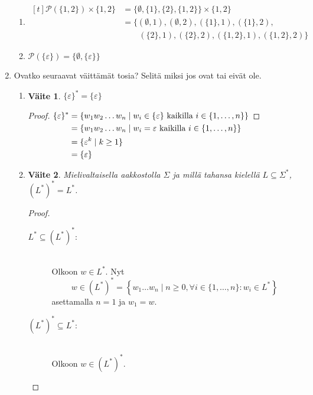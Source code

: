 \documentclass[a4paper,11pt,draft]{article}
\newtheorem*{claim}{Väite}
\begin{document}
\begin{enumerate}
\begin{enumerate}
  \item
    \begin{math}
      \begin{aligned}[t]
        \mathcal{P}(\{1,2\}) \times \{1,2\}
        &= \{\emptyset, \{1\}, \{2\}, \{1,2\}\} \times \{1,2\} \\
        &= \{(\emptyset, 1), (\emptyset, 2), (\{1\}, 1), (\{1\}, 2),\\
        &\qquad(\{2\}, 1), (\{2\}, 2), (\{1,2\}, 1), (\{1,2\}, 2)\}
      \end{aligned}
    \end{math}

  \item
    $\mathcal{P}(\{\varepsilon\}) = \{\emptyset, \{\varepsilon\}\}$
  \end{enumerate}

\item Ovatko seuraavat väittämät tosia? Selitä miksi jos ovat tai
  eivät ole.
  \begin{enumerate}
  \item
    \begin{claim}
      $\{\varepsilon\}^{*} = \{\varepsilon\}$
    \end{claim}
    \begin{proof}
    \begin{math}
      \begin{aligned}[t]
        \{\varepsilon\}^*
        &= \{w_1w_2 \ldots w_n \mid w_i \in \{\varepsilon\} \text{
          kaikilla } i \in \{1, \ldots, n\}\}\\
        &= \{w_1w_2 \ldots w_n \mid w_i = \varepsilon \text{ kaikilla
        } i \in \{1, \ldots, n\}\}\\
        &= \{\varepsilon^k \mid k \ge 1\}\\
        &= \{\varepsilon\} \qedhere
      \end{aligned}
    \end{math}
    \end{proof}

\newpage
  \item
    \begin{claim}
      Mielivaltaisella aakkostolla $\Sigma$ ja millä tahansa kielellä
      $L \subseteq \Sigma^*$, $(L^*)^* = L^*$.
    \end{claim}
    \begin{proof}
      \hfill
      \begin{description}
      \item[$L^* \subseteq (L^*)^*$:] \hfill \\
        Olkoon $w \in L^*$. Nyt
        \begin{equation*}
        w \in (L^*)^* = \left\{w_1 \ldots w_n \mid n \ge 0,\forall i
        \in \{1, \ldots, n\}: w_i \in L^* \right\}
        \end{equation*}
        asettamalla $n = 1$ ja $w_1 = w$.
      \item[$(L^*)^* \subseteq L^*$:] \hfill \\
        Olkoon $w \in (L^*)^*$.


\end{description}
\end{proof}
\end{enumerate}
\end{enumerate}
\end{document}
